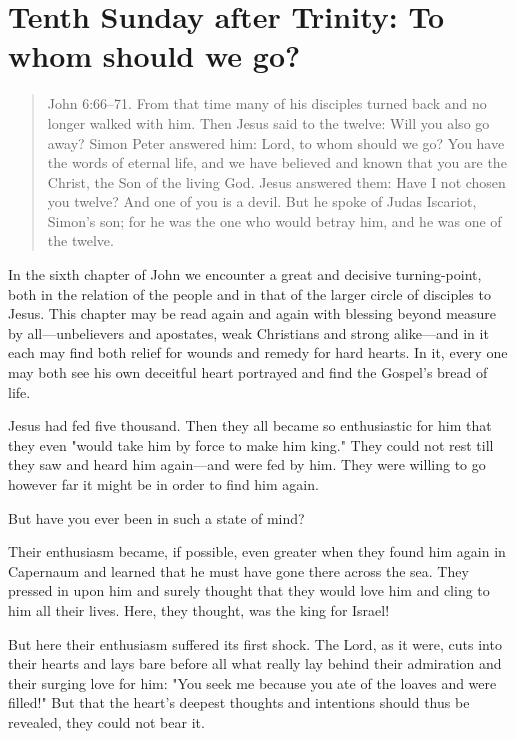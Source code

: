 
\section{Tenth Sunday after Trinity: To whom should we go?}


\begin{quote}

John 6:66–71. From that time many of his disciples turned back and no longer walked with him. Then Jesus said to the twelve: Will you also go away? Simon Peter answered him: Lord, to whom should we go? You have the words of eternal life, and we have believed and known that you are the Christ, the Son of the living God. Jesus answered them: Have I not chosen you twelve? And one of you is a devil. But he spoke of Judas Iscariot, Simon’s son; for he was the one who would betray him, and he was one of the twelve.

\end{quote}

\bigskip


In the sixth chapter of John we encounter a great and decisive turning-point, both in the relation of the people and in that of the larger circle of disciples to Jesus. This chapter may be read again and again with blessing beyond measure by all—unbelievers and apostates, weak Christians and strong alike—and in it each may find both relief for wounds and remedy for hard hearts. In it, every one may both see his own deceitful heart portrayed and find the Gospel’s bread of life.

Jesus had fed five thousand. Then they all became so enthusiastic for him that they even "would take him by force to make him king." They could not rest till they saw and heard him again—and were fed by him. They were willing to go however far it might be in order to find him again.

But have you ever been in such a state of mind?

Their enthusiasm became, if possible, even greater when they found him again in Capernaum and learned that he must have gone there across the sea. They pressed in upon him and surely thought that they would love him and cling to him all their lives. Here, they thought, was the king for Israel!

But here their enthusiasm suffered its first shock. The Lord, as it were, cuts into their hearts and lays bare before all what really lay behind their admiration and their surging love for him: "You seek me because you ate of the loaves and were filled!" But that the heart’s deepest thoughts and intentions should thus be revealed, they could not bear it.

